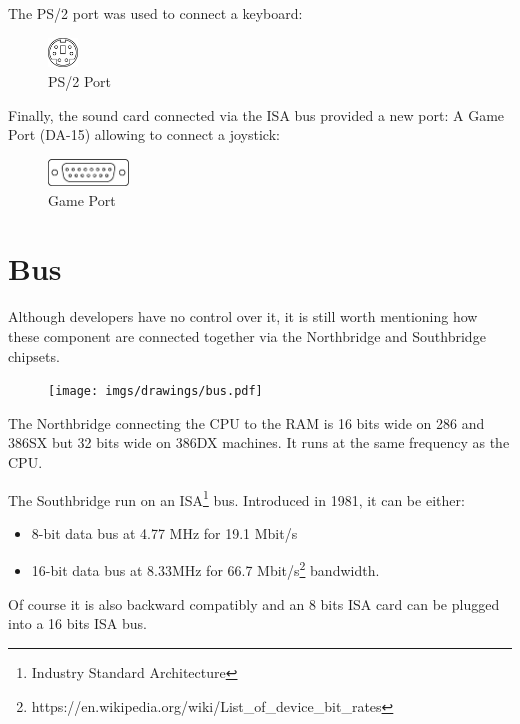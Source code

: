 \documentclass[book.tex]{subfiles}
\begin{document}
The PS/2 port was used to connect a keyboard:
 \begin{figure}[H]
\centering
\includegraphics[width=0.07\textwidth]{imgs/drawings/ports/MiniDIN-6_PS2.eps}
\caption{PS/2 Port}
\label{fig:ps2Port}
\end{figure}


Finally, the sound card connected via the ISA bus provided a new port: A Game Port (DA-15) allowing to connect a joystick:
 \begin{figure}[H]
\centering
\includegraphics[width=0.19\textwidth]{imgs/drawings/ports/DA-15_GamePort.eps}
\caption{Game Port}
\label{fig:gamePort}
\end{figure}


\section{Bus}
Although developers have no control over it, it is still worth mentioning how these component are connected together via the Northbridge and Southbridge chipsets.\\ 
\par
\begin{figure}[H]
\centering
      \texttt{[image: imgs/drawings/bus.pdf]}
\end{figure}
\par
The Northbridge connecting the CPU to the RAM is 16 bits wide on 286 and 386SX but 32 bits wide on 386DX machines. It runs at the same frequency as the CPU.\\
\par
The Southbridge run on an ISA\footnote{Industry Standard Architecture} bus. Introduced in 1981, it can be either:
\begin{itemize}
\item 8-bit data bus at 4.77 MHz  for 19.1 Mbit/s
\item 16-bit data bus at 8.33MHz for 66.7 Mbit/s\footnote{https://en.wikipedia.org/wiki/List\_of\_device\_bit\_rates} bandwidth.
\end{itemize}
Of course it is also backward compatibly and an 8 bits ISA card can be plugged into a 16 bits ISA bus.\\
\par
\end{document}
